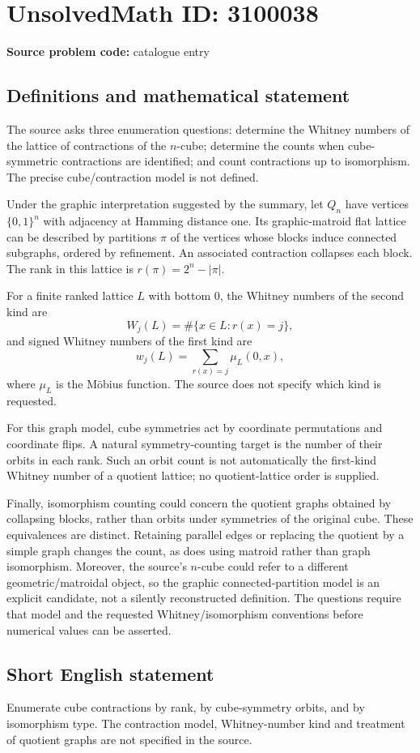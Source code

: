 \documentclass[11pt]{article}
\begin{document}
\section*{UnsolvedMath ID: 3100038}
\textbf{Source problem code:} catalogue entry
\subsection{Definitions and mathematical statement}
The source asks three enumeration questions: determine the Whitney numbers of the lattice of contractions of the $n$-cube; determine the counts when cube-symmetric contractions are identified; and count contractions up to isomorphism. The precise cube/contraction model is not defined.

Under the graphic interpretation suggested by the summary, let $Q_n$ have vertices $\{0,1\}^n$ with adjacency at Hamming distance one. Its graphic-matroid flat lattice can be described by partitions $\pi$ of the vertices whose blocks induce connected subgraphs, ordered by refinement. An associated contraction collapses each block. The rank in this lattice is $r(\pi)=2^n-|\pi|$.

For a finite ranked lattice $L$ with bottom $0$, the Whitney numbers of the second kind are
\[
W_j(L)=\#\{x\in L:r(x)=j\},
\]
and signed Whitney numbers of the first kind are
\[
w_j(L)=\sum_{r(x)=j}\mu_L(0,x),
\]
where $\mu_L$ is the M\"obius function. The source does not specify which kind is requested.

For this graph model, cube symmetries act by coordinate permutations and coordinate flips. A natural symmetry-counting target is the number of their orbits in each rank. Such an orbit count is not automatically the first-kind Whitney number of a quotient lattice; no quotient-lattice order is supplied.

Finally, isomorphism counting could concern the quotient graphs obtained by collapsing blocks, rather than orbits under symmetries of the original cube. These equivalences are distinct. Retaining parallel edges or replacing the quotient by a simple graph changes the count, as does using matroid rather than graph isomorphism. Moreover, the source's $n$-cube could refer to a different geometric/matroidal object, so the graphic connected-partition model is an explicit candidate, not a silently reconstructed definition. The questions require that model and the requested Whitney/isomorphism conventions before numerical values can be asserted.
\subsection{Short English statement}
Enumerate cube contractions by rank, by cube-symmetry orbits, and by isomorphism type. The contraction model, Whitney-number kind and treatment of quotient graphs are not specified in the source.
\end{document}
